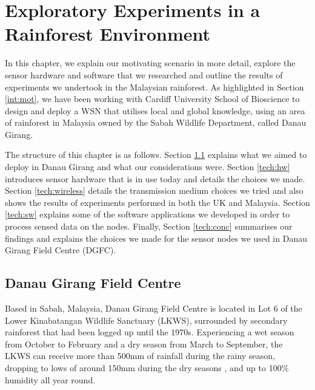 \chapter{Exploratory Experiments in a Rainforest Environment}\label{chap:technical}
	In this chapter, we explain our motivating scenario in more detail, explore the sensor hardware and software that we researched and outline the results of experiments we undertook in the Malaysian rainforest. As highlighted in Section \ref{int:mot}, we have been working with Cardiff University School of Bioscience to design and deploy a WSN that utilises local and global knowledge, using an area of rainforest in Malaysia owned by the Sabah Wildlife Department, called Danau Girang.

The structure of this chapter is as follows. Section \ref{tech:motiv} explains what we aimed to deploy in Danau Girang and what our considerations were. Section \ref{tech:hw} introduces sensor hardware that is in use today and details the choices we made. Section \ref{tech:wireless} details the transmission medium choices we tried and also shows the results of experiments performed in both the UK and Malaysia. Section \ref{tech:sw} explains some of the software applications we developed in order to process sensed data on the nodes. Finally, Section \ref{tech:conc} summarises our findings and explains the choices we made for the sensor nodes we used in Danau Girang Field Centre (DGFC). 

\section{Danau Girang Field Centre}\label{tech:motiv}
Based in Sabah, Malaysia, Danau Girang Field Centre is located in Lot 6 of the Lower Kinabatangan Wildlife Sanctuary (LKWS), surrounded by secondary rainforest that had been logged up until the 1970s. Experiencing a wet season from October to February and a dry season from March to September, the LKWS can receive more than 500mm of rainfall during the rainy season, dropping to lows of around 150mm during the dry seasons \cite{Walsh2009}, and up to 100\% humidity all year round. 

